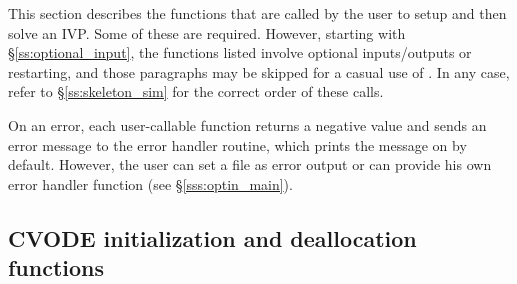 This section describes the {\cvode} functions that are called by the
user to setup and then solve an IVP. Some of these are required. However,
starting with \S\ref{ss:optional_input}, the functions listed involve
optional inputs/outputs or restarting, and those paragraphs may be
skipped for a casual use of {\cvode}. In any case, refer to
\S\ref{ss:skeleton_sim} for the correct order of these calls.

On an error, each user-callable function returns a negative value and
sends an error message to the error handler routine, which prints the
message on  by default. However, the user can set a file
as error output or can provide his own error handler function (see
\S\ref{sss:optin_main}).

\subsection{CVODE initialization and deallocation functions}
\label{sss:cvodemalloc}

